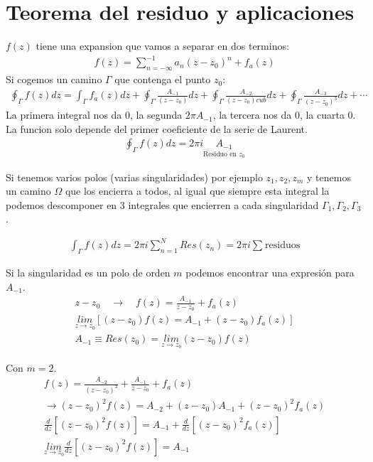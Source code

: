 \documentclass{article}
\newcommand{\caja}[3]{%
  \begin{tcolorbox}[colback=#1!5!white,colframe=#1!25!black,title=#2]
    #3
  \end{tcolorbox}%
}
\begin{document}
\section{Teorema del residuo y aplicaciones }
$ f(z)  $ tiene una expansion que vamos a separar en dos terminos: 
\begin{gather*}
  f(z) = \displaystyle\sum_{n= - \infty}^{-1 } a_n (z-z_0 )^ {n } + f_a(z)  
\end{gather*}
Si cogemos un camino $ \Gamma $ que contenga el punto $ z_0  $: 
\begin{gather*}
  \displaystyle\oint_{\Gamma}^{} f(z) dz = \displaystyle\int_{\Gamma }^{} f_a(z) dz + \displaystyle\oint_{\Gamma }^{} \frac{A _{-1 } }{(z-z_0)}dz + \displaystyle\oint_{\Gamma }^{} \frac{A _{-2 } }{(z-z_0)cub}dz + \displaystyle\oint_{\Gamma }^{} \frac{A _{-3 } }{(z-z_0)^ {3}}dz + \cdots
\end{gather*}
La primera integral nos da 0, la segunda $ 2\pi A _{-1 } $, la tercera nos da 0, la cuarta 0. La funcion solo depende del primer coeficiente de la serie de Laurent. 
\begin{gather*}
  \displaystyle\oint_{\Gamma }^{} f(z) dz = 2\pi i \underset{\text{Residuo en }z_0 }{A _{-1 }  }
\end{gather*}

Si tenemos varios polos (varias singularidades) por ejemplo $ z_1,z_2,z_m  $ y tenemos un camino $ \Omega  $ que los encierra a todos, al igual que siempre esta integral la podemos descomponer en 3 integrales que encierren a cada singularidad $ \Gamma_1, \Gamma_2, \Gamma_3  $.
\caja{red}{}{
\begin{gather*}
  \displaystyle\int_{\Gamma }^{} f(z) dz = 2\pi i \displaystyle\sum_{n= 1 }^{N }Res(z_n ) = 2\pi i \displaystyle\sum_{}^{} \text{residuos}
\end{gather*}
}

Si la singularidad es un polo de orden $ m  $ podemos encontrar una expresión para $ A _{-1 }  $. 
\begin{gather*}
  z - z_0 \quad \rightarrow \quad f(z) = \frac{A _{-1 }  }{z-z_0 } + f_a (z) \\
  \underset{z  \rightarrow z_0 }{lim}\left[(z-z_0 ) f(z) = A _{-1 }  + (z -z_0 ) f_a(z) \right]\\
  A _{-1 }  \equiv  Res (z_0 ) = \underset{z  \rightarrow z_0 }{lim}(z-z_0 )f(z) 
\end{gather*}

Con $ m= 2  $.
\begin{gather*}
  f(z) = \frac{A _{-2 } }{(z-z_0 )^2} + \frac{A _{-1 } }{z-z_0 } + f_a(z) \\
  \rightarrow (z-z_0) ^2 f(z) = A _{-2 } + (z-z_0 ) A _{-1 }  + (z-z_0) ^2 f_a(z)\\
  \frac{d  }{d z } \left[(z-z_0 ) ^2 f(z) \right] = A _{-1 } + \frac{d  }{d z } \left[(z-z_0 ) ^2 f_a(z) \right]\\
  \underset{z  \rightarrow z_0 }{lim}\frac{d  }{d z } \left[(z-z_0) ^2 f(z) \right] = A _{-1 } 
\end{gather*}
\end{document}
